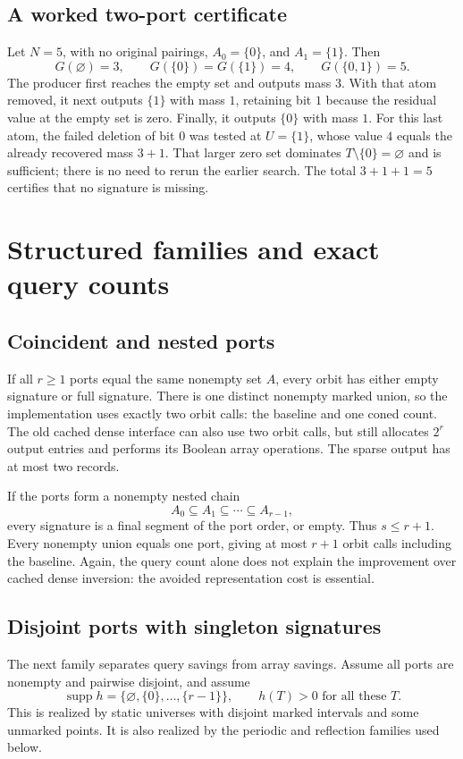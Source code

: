 \documentclass[11pt,letterpaper]{article}
\theoremstyle{definition}
\newcommand{\supp}{\operatorname{supp}}
\begin{document}
\subsection{A worked two-port certificate}
Let $N=5$, with no original pairings, $A_0=\{0\}$, and $A_1=\{1\}$. Then
\[
 G(\varnothing)=3,\qquad G(\{0\})=G(\{1\})=4,\qquad G(\{0,1\})=5.
\]
The producer first reaches the empty set and outputs mass $3$. With that
atom removed, it next outputs $\{1\}$ with mass $1$, retaining bit $1$
because the residual value at the empty set is zero. Finally, it outputs
$\{0\}$ with mass $1$. For this last atom, the failed deletion of bit $0$
was tested at $U=\{1\}$, whose value $4$ equals the already recovered mass
$3+1$. That larger zero set dominates $T\setminus\{0\}=\varnothing$ and
is sufficient; there is no need to rerun the earlier search. The total
$3+1+1=5$ certifies that no signature is missing.

\section{Structured families and exact query counts}\label{sec:families}

\subsection{Coincident and nested ports}
If all $r\ge1$ ports equal the same nonempty set $A$, every orbit has either
empty signature or full signature. There is one distinct nonempty marked
union, so the implementation uses exactly two orbit calls: the baseline and
one coned count. The old cached dense interface can also use two orbit
calls, but still allocates $2^r$ output entries and performs its Boolean
array operations. The sparse output has at most two records.

If the ports form a nonempty nested chain
\[
 A_0\subseteq A_1\subseteq\cdots\subseteq A_{r-1},
\]
every signature is a final segment of the port order, or empty. Thus
$s\le r+1$. Every nonempty union equals one port, giving at most $r+1$
orbit calls including the baseline. Again, the query count alone does not
explain the improvement over cached dense inversion: the avoided
representation cost is essential.

\subsection{Disjoint ports with singleton signatures}
The next family separates query savings from array savings. Assume all
ports are nonempty and pairwise disjoint, and assume
\begin{equation}\label{eq:singletons}
 \supp h=\{\varnothing,\{0\},\ldots,\{r-1\}\},
 \qquad h(T)>0\text{ for all these }T.
\end{equation}
This is realized by static universes with disjoint marked intervals and
some unmarked points. It is also realized by the periodic and reflection
families used below.
\end{document}
